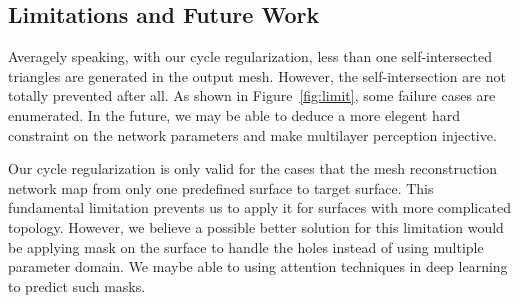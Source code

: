 \subsection{Limitations and Future Work}
Averagely speaking, with our cycle regularization, less than one self-intersected triangles are generated in the output mesh. However, the self-intersection are not totally prevented after all. As shown in Figure~\ref{fig:limit}, some failure cases are enumerated. In the future,  we may be able to deduce a more elegent hard constraint on the network parameters and make multilayer perception injective. 

Our cycle regularization is only valid for the cases that the mesh reconstruction network map from only one predefined surface to target surface. This fundamental limitation prevents us to apply it for surfaces with more complicated topology. However, we believe a possible better solution for this limitation would be applying mask on the surface to handle the holes instead of using multiple parameter domain. We maybe able to using attention techniques in deep learning to predict such masks.